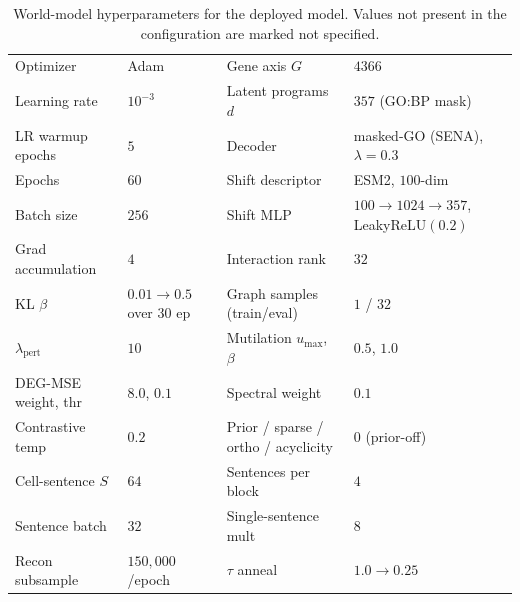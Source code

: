 \begin{table}[h]\centering\footnotesize
\caption{World-model hyperparameters for the deployed model. Values not present in the
configuration are marked not specified.}
\label{tab:wm_hparams}
\begin{tabular}{@{}llll@{}}
\toprule
Optimizer & Adam & Gene axis $G$ & $4366$ \\
Learning rate & $10^{-3}$ & Latent programs $d$ & $357$ (GO:BP mask) \\
LR warmup epochs & $5$ & Decoder & masked-GO (SENA), $\lambda{=}0.3$ \\
Epochs & $60$ & Shift descriptor & ESM2, $100$-dim \\
Batch size & $256$ & Shift MLP & $100\!\to\!1024\!\to\!357$, LeakyReLU$(0.2)$ \\
Grad accumulation & $4$ & Interaction rank & $32$ \\
KL $\beta$ & $0.01\!\to\!0.5$ over $30$ ep & Graph samples (train/eval) & $1$ / $32$ \\
$\lambda_{\mathrm{pert}}$ & $10$ & Mutilation $u_{\max}$, $\beta$ & $0.5$, $1.0$ \\
DEG-MSE weight, thr & $8.0$, $0.1$ & Spectral weight & $0.1$ \\
Contrastive temp & $0.2$ & Prior / sparse / ortho / acyclicity & $0$ (prior-off) \\
Cell-sentence $S$ & $64$ & Sentences per block & $4$ \\
Sentence batch & $32$ & Single-sentence mult & $8$ \\
Recon subsample & $150{,}000$/epoch & $\tau$ anneal & $1.0\!\to\!0.25$ \\
\bottomrule
\end{tabular}
\end{table}


